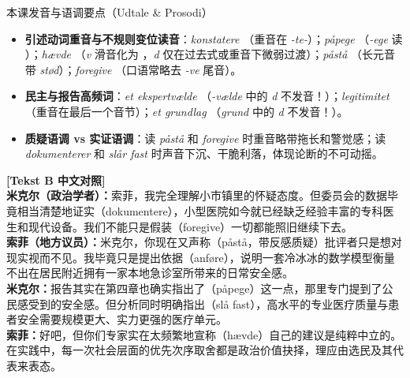 \begin{tipbox}{本课发音与语调要点（Udtale \& Prosodi）}
\begin{itemize}
  \item \textbf{引述动词重音与不规则变位读音}：\textit{konstatere} （重音在 \textit{-te-}）；\textit{påpege} （\textit{-ege} 读 ）；\textit{hævde} （\textit{v} 滑音化为 ，\textit{d} 仅在过去式或重音下微弱过渡）；\textit{påstå} （长元音带 \textit{stød}）；\textit{foregive} （口语常略去 \textit{-ve} 尾音）。
  \item \textbf{民主与报告高频词}：\textit{et ekspertvælde} （\textit{-vælde} 中的 \textit{d} 不发音！）；\textit{legitimitet} （重音在最后一个音节）；\textit{et grundlag} （\textit{grund} 中的 \textit{d} 不发音！）。
  \item \textbf{质疑语调 vs 实证语调}：读 \textit{påstå} 和 \textit{foregive} 时重音略带拖长和警觉感；读 \textit{dokumenterer} 和 \textit{slår fast} 时声音下沉、干脆利落，体现论断的不可动摇。
\end{itemize}
\end{tipbox}

\begin{transbox}
\small
\textbf{\color{NCDTeal}[Tekst B 中文对照]}\\
\textbf{米克尔（政治学者）：}索菲，我完全理解小市镇里的怀疑态度。但委员会的数据毕竟相当清楚地证实（dokumentere），小型医院如今就已经缺乏经验丰富的专科医生和现代设备。我们不能只是假装（foregive）一切都能照旧继续下去。\\
\textbf{索菲（地方议员）：}米克尔，你现在又声称（påstå，带反感质疑）批评者只是想对现实视而不见。我毕竟只是提出依据（anføre），说明一套冷冰冰的数学模型衡量不出在居民附近拥有一家本地急诊室所带来的日常安全感。\\
\textbf{米克尔：}报告其实在第四章也确实指出了（påpege）这一点，那里专门提到了公民感受到的安全感。但分析同时明确指出（slå fast），高水平的专业医疗质量与患者安全需要规模更大、实力更强的医疗单元。\\
\textbf{索菲：}好吧，但你们专家实在太频繁地宣称（hævde）自己的建议是纯粹中立的。在实践中，每一次社会层面的优先次序取舍都是政治价值抉择，理应由选民及其代表来表态。
\end{transbox}


